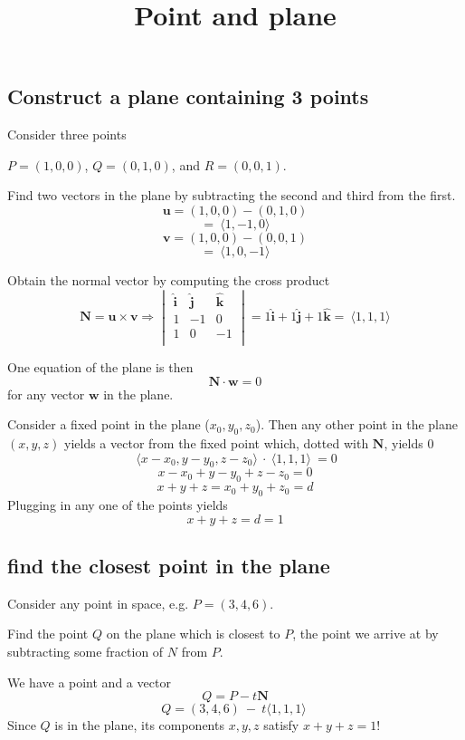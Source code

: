 \documentclass[11pt, oneside]{article}
\title{Point and plane}
\date{}
\begin{document}
\maketitle
\Large

\subsection*{Construct a plane containing 3 points}

Consider three points 

$P = (1,0,0)$, $Q = (0,1,0)$, and $R = (0,0,1)$.  

Find two vectors in the plane by subtracting the second and third from the first.
\[ \mathbf{u} = (1,0,0) - (0,1,0) \]
\[ =  \ \langle 1,-1,0 \rangle \]
\[ \mathbf{v} = (1,0,0) - (0,0,1) \]
\[ = \ \langle 1,0,-1 \rangle \]

Obtain the normal vector by computing the cross product
\[ \mathbf{N} = \mathbf{u} \times \mathbf{v} 
\Rightarrow 
\begin{vmatrix}
\mathbf{\hat{i}} & \mathbf{\hat{j}}  & \mathbf{\hat{k}}  \\
1 & -1 & 0 \\
1 & 0 & -1 \\ 
\end{vmatrix} 
= 1 \mathbf{\hat{i}}  + 1 \mathbf{\hat{j}}  + 1 \mathbf{\hat{k}}  = \ \langle 1,1,1 \rangle  \]

One equation of the plane is then
\[ \mathbf{N} \cdot \mathbf{w} = 0 \] 
for any vector $\mathbf{w}$ in the plane.

Consider a fixed point in the plane ($x_0,y_0,z_0$).  Then any other point in the plane $(x,y,z)$ yields a vector from the fixed point which, dotted with $\mathbf{N}$, yields $0$
\[ \ \langle x-x_0,y-y_0,z-z_0 \rangle \  \cdot \  \langle 1,1,1 \rangle \ = 0 \]
\[ x - x_0 + y - y_0 + z - z_0 = 0 \]
\[ x + y + z = x_0 + y_0 + z_0 = d \]
Plugging in any one of the points yields
\[ x + y + z = d = 1 \]

\subsection*{find the closest point in the plane}

Consider any point in space, e.g. $P = (3,4,6)$.  

Find the point $Q$ on the plane which is closest to $P$, the point we arrive at by subtracting some fraction of $N$ from $P$.  

We have a point and a vector
\[ Q = P - t \mathbf{N} \]
\[ Q = (3,4,6) \ - \ t \langle 1,1,1 \rangle \ \]
Since $Q$ is in the plane, its components $x,y,z$ satisfy $x + y + z = 1$!  
\end{document}

